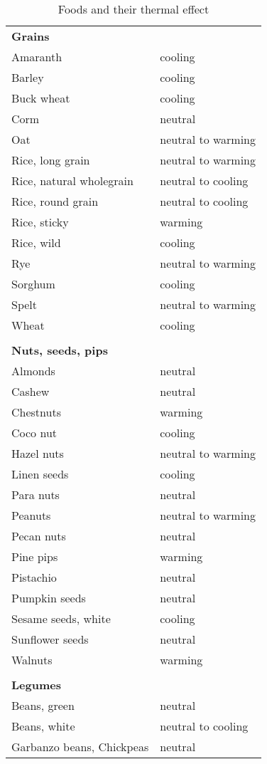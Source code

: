 \documentclass[../main.tex]{subfiles}
\begin{document}
\begin{longtable}{ll}
  \caption{Foods and their thermal effect} \\
  \toprule
\multicolumn{2}{l}{\textbf{Grains}} \\
Amaranth & cooling \\
Barley & cooling \\
Buck wheat & cooling \\
Corm & neutral  \\
Oat & neutral to warming \\
Rice, long grain & neutral to warming \\
Rice, natural wholegrain & neutral to cooling \\
Rice, round grain & neutral to cooling \\
Rice, sticky & warming \\
Rice, wild & cooling \\
Rye & neutral to warming \\
Sorghum & cooling \\
Spelt & neutral to warming \\
Wheat & cooling \\
 \\
\multicolumn{2}{l}{\textbf{Nuts, seeds, pips}} \\
Almonds & neutral \\
Cashew & neutral \\
Chestnuts & warming \\
Coco nut & cooling \\
Hazel nuts & neutral to warming \\
Linen seeds & cooling \\
Para nuts & neutral \\
Peanuts & neutral to warming \\
Pecan nuts & neutral \\
Pine pips & warming \\
Pistachio & neutral \\
Pumpkin seeds & neutral \\
Sesame seeds, white & cooling \\
Sunflower seeds & neutral \\
Walnuts & warming \\
 \\
\multicolumn{2}{l}{\textbf{Legumes}} \\
Beans, green & neutral   \\
Beans, white & neutral to cooling \\
Garbanzo beans, Chickpeas & neutral  \\

\end{longtable}
\end{document}
